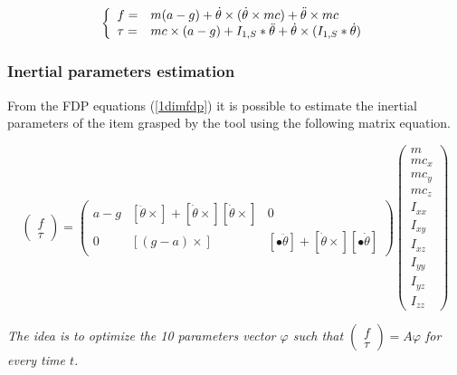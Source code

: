 \documentclass[a4paper, 11pt]{article}
\begin{document}
\begin{equation}
 \label{1dimfdp}
 \left \{
 \begin{array}{l l}
  f =    & m (a - g) + \dot{\theta} \times (\dot{\theta} \times m c) + \ddot{\theta} \times m c \\
  \tau = & m c \times (a - g)
  + I_{1, S} \ast \ddot{\theta} + \dot{\theta} \times (I_{1, S} \ast \dot{\theta})
 \end{array}
 \right.
\end{equation}

\subsubsection{Inertial parameters estimation}
\label{olinpe}

From the FDP equations (\ref{1dimfdp}) it is possible to estimate the inertial parameters of the item grasped by the tool using the following matrix equation.

\begin{equation}
 \begin{pmatrix}
  f    \\
  \tau
 \end{pmatrix}
 =
 \begin{pmatrix}
  a - g & \left[ \ddot{\theta} \times \right] +  \left[ \dot{\theta} \times \right] \left[ \dot{\theta} \times \right] & 0                                                                                                             \\
  0     & \left[ (g - a) \times \right]                                                                                & \left[ \bullet \ddot{\theta} \right] + \left[ \dot{\theta} \times \right] \left[ \bullet \dot{\theta} \right]
 \end{pmatrix}
 \begin{pmatrix}
  m      \\
  m c_x  \\
  m c_y  \\
  m c_z  \\
  I_{xx} \\
  I_{xy} \\
  I_{xz} \\
  I_{yy} \\
  I_{yz} \\
  I_{zz}
 \end{pmatrix}
\end{equation}

{\it
 The idea is to optimize the 10 parameters vector $\varphi$ such that $
 \begin{pmatrix}
  f    \\
  \tau
 \end{pmatrix} = A \varphi$
 for every time $t$.
}
\end{document}

